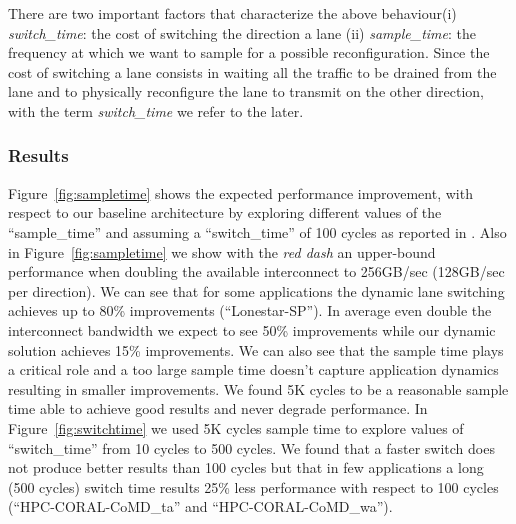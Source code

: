 There are two important factors that characterize the above behaviour(i) 
\emph{switch\_time}: the cost of switching the direction a lane (ii) 
\emph{sample\_time}: the frequency at which we want to sample for a possible 
reconfiguration. Since the cost of switching a lane consists in waiting all 
the traffic to be drained from the lane and to physically reconfigure the 
lane to transmit on the other direction, with the term \emph{switch\_time} we 
refer to the later. 

\subsubsection{Results}
Figure~\ref{fig:sampletime} shows the expected performance improvement, with 
respect to our baseline architecture by exploring different values 
of the ``sample\_time'' and assuming a ``switch\_time'' of 100 cycles 
as reported in \cite{REALLY_NEED_REF_HERE}. Also in Figure~\ref{fig:sampletime}
we show with the \emph{red dash} an upper-bound performance when doubling
the available interconnect to 256GB/sec (128GB/sec per direction). 
We can see that for some applications the dynamic lane switching achieves up to
80\% improvements (``Lonestar-SP''). In average even double the interconnect 
bandwidth we expect to see 50\% improvements while our dynamic solution 
achieves 15\% improvements. We can also see that the sample time plays a 
critical role and a too large sample time doesn't capture application dynamics 
resulting in smaller improvements. We found 5K cycles to be a reasonable sample
time able to achieve good results and never degrade performance. 
In Figure~\ref{fig:switchtime} we used 5K cycles sample time to
explore values of ``switch\_time'' from 10 cycles to 500 cycles.
We found that a faster switch does not produce better results than 100 cycles
but that in few applications a long (500 cycles) switch time results 25\% 
less performance with respect to 100 cycles (``HPC-CORAL-CoMD\_ta'' and 
``HPC-CORAL-CoMD\_wa'').




